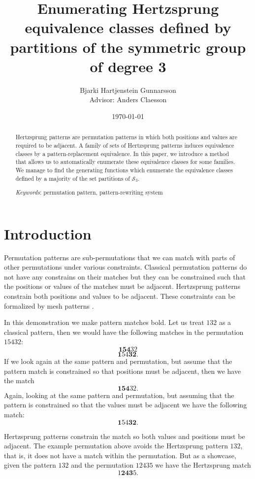 \documentclass[a4paper, 11pt, english]{article}
\newcommand{\breath}{\vspace{6pt plus 2pt minus 1pt}\noindent}
\theoremstyle{definition}
\newcommand{\Sym}{\mathcal{S}}
\begin{document}
\title{Enumerating Hertzsprung equivalence classes defined by partitions of the symmetric group of degree 3}
\author{Bjarki Hartjenstein Gunnarsson \\[0.6cm]{\small Advisor: Anders Claesson}}
\date{\today}
\maketitle

\begin{abstract}
    Hertzsprung patterns are permutation patterns in which both positions and values are required to
    be adjacent. A family of sets of Hertzsprung patterns induces equivalence classes by
    a pattern-replacement equivalence. In this paper, we introduce a method that allows us 
    to automatically enumerate these equivalence classes for some families. We manage to find the
    generating functions which enumerate the equivalence classes defined by a majority of the set partitions of $\Sym_3$.

    \breath \emph{Keywords}: permutation pattern, pattern-rewriting system
\end{abstract}

\section{Introduction}
Permutation patterns are sub-permutations that we can match with parts of other
permutations under various constraints. 
Classical permutation patterns do not have any constrains on their matches but they can
be constrained such that the positions or values of the matches must be adjacent.
Hertzsprung patterns constrain both positions and values to be adjacent. 
These constraints can be formalized by mesh patterns \cite{claesson:2011}.

In this demonstration we make pattern matches bold.  Let us treat $132$ as a classical
pattern, then we would have the following matches in the permutation $15432$:
\[
    \bm{154}32
\]
\[
    \bm{1}54\bm{32}.
\]
If we look again at the same pattern and permutation, but assume that the
pattern match is constrained so that positions must be adjacent, then we have the match
\[
    \bm{154}32.
\]
Again, looking at the same pattern and permutation, but assuming that the
pattern is constrained so that the values must be adjacent we have the following
match:
\[
    \bm{1}54\bm{32}.
\]

Hertzsprung patterns constrain the match so both values and positions must be
adjacent. The example permutation above avoids the Hertzsprung pattern $132$, that is, it does not have a match
within the permutation. But as a showcase, given the pattern $132$ and the permutation $12435$ we
have the Hertzsprung match
\[
    1\bm{243}5.
\]
\end{document}
